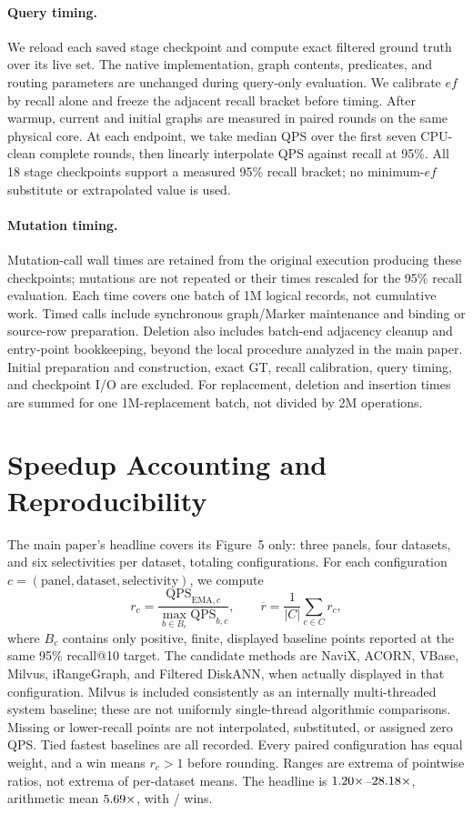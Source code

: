\paragraph{Query timing.}
We reload each saved stage checkpoint and compute exact filtered ground truth over its live set.
The native implementation, graph contents, predicates, and routing parameters are unchanged during query-only evaluation.
We calibrate $ef$ by recall alone and freeze the adjacent recall bracket before timing.
After warmup, current and initial graphs are measured in paired rounds on the same physical core.
At each endpoint, we take median QPS over the first seven CPU-clean complete rounds, then linearly interpolate QPS against recall at 95\%.
All 18 stage checkpoints support a measured 95\% recall bracket; no minimum-$ef$ substitute or extrapolated value is used.

\paragraph{Mutation timing.}
Mutation-call wall times are retained from the original execution producing these checkpoints; mutations are not repeated or their times rescaled for the 95\% recall evaluation.
Each time covers one batch of 1M logical records, not cumulative work.
Timed calls include synchronous graph/Marker maintenance and binding or source-row preparation.
Deletion also includes batch-end adjacency cleanup and entry-point bookkeeping, beyond the local procedure analyzed in the main paper.
Initial preparation and construction, exact GT, recall calibration, query timing, and checkpoint I/O are excluded.
For replacement, deletion and insertion times are summed for one 1M-replacement batch, not divided by 2M operations.

\section{Speedup Accounting and Reproducibility}

The main paper's headline covers its Figure~5 only: three panels, four datasets, and six selectivities per dataset, totaling \EMAMultiTotal{} configurations.
For each configuration $c=(\mathrm{panel},\mathrm{dataset},\mathrm{selectivity})$, we compute
\[
r_c=\frac{\mathrm{QPS}_{\mathrm{EMA},c}}
{\max_{b\in B_c}\mathrm{QPS}_{b,c}},
\qquad \overline r=\frac{1}{|C|}\sum_{c\in C}r_c,
\]
where $B_c$ contains only positive, finite, displayed baseline points reported at the same 95\% recall@10 target.
The candidate methods are NaviX, ACORN, VBase, Milvus, iRangeGraph, and Filtered DiskANN, when actually displayed in that configuration.
Milvus is included consistently as an internally multi-threaded system baseline; these are not uniformly single-thread algorithmic comparisons.
Missing or lower-recall points are not interpolated, substituted, or assigned zero QPS.
Tied fastest baselines are all recorded.
Every paired configuration has equal weight, and a win means $r_c>1$ before rounding.
Ranges are extrema of pointwise ratios, not extrema of per-dataset means.
The headline is $1.20\times$--$28.18\times$, arithmetic mean $5.69\times$, with \EMAMultiWins/\EMAMultiTotal{} wins.

